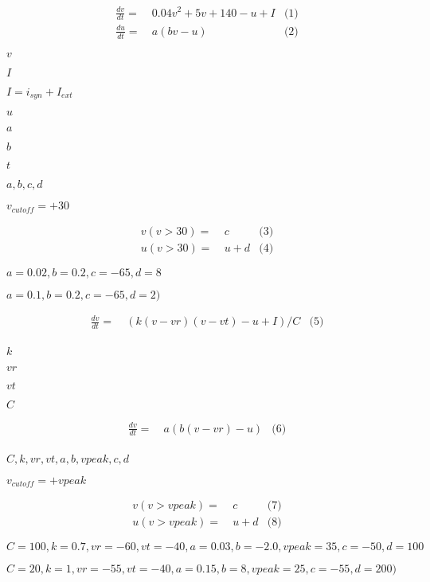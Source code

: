 \documentclass{article}
\begin{document}
\begin{align*} \frac{dv}{dt} = & ~ 0.04v^2 + 5v + 140 - u + I & \text{(1)}\\ \frac{du}{dt} = & ~ a (bv - u) & \text{(2)} \end{align*}
\pagebreak

$v$
\pagebreak

$I$
\pagebreak

$I = i_{syn} + I_{ext}$
\pagebreak

$u$
\pagebreak

$a$
\pagebreak

$b$
\pagebreak

$t$
\pagebreak

$a, b, c, d$
\pagebreak

$v_{cutoff}=+30$
\pagebreak

\begin{align*} v(v>30) = & ~ c & \text{(3)}\\ u(v>30) = & ~ u + d & \text{(4)}\end{align*}
\pagebreak

$a=0.02, b=0.2, c=-65, d=8$
\pagebreak

$a=0.1, b=0.2, c=-65, d=2)$
\pagebreak

\begin{align*} \frac{dv}{dt} = & ~ (k (v - vr) (v - vt) - u + I) / C & \text{(5)}\\ \end{align*}
\pagebreak

$k$
\pagebreak

$vr$
\pagebreak

$vt$
\pagebreak

$C$
\pagebreak

\begin{align*} \frac{dv}{dt} = & ~ a (b (v - vr) - u) & \text{(6)}\\ \end{align*}
\pagebreak

$C, k, vr, vt, a, b, vpeak, c, d$
\pagebreak

$v_{cutoff}=+vpeak$
\pagebreak

\begin{align*} v(v>vpeak) = & ~ c & \text{(7)}\\ u(v>vpeak) = & ~ u + d & \text{(8)}\end{align*}
\pagebreak

$C=100, k=0.7, vr=-60, vt=-40, a=0.03, b=-2.0, vpeak=35, c=-50, d=100$
\pagebreak

$C=20, k=1, vr=-55, vt=-40, a=0.15, b=8, vpeak=25, c=-55, d=200)$
\pagebreak
\end{document}
